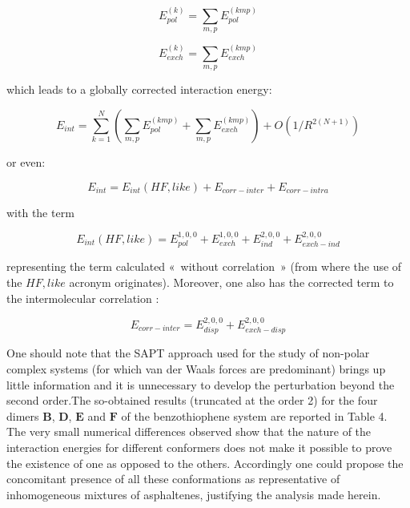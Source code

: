		\begin{equation}
		E_{pol}^{(k)} = \sum_{m,p} E_{pol}^{(kmp)}
		\end{equation}
		
		\begin{equation}
		E_{exch}^{(k)} = \sum_{m,p} E_{exch}^{(kmp)}
		\end{equation}
		
		which leads to a globally corrected interaction energy: 
		
		\begin{equation}
		E_{int} = \sum_{k=1}^{N} ( \sum_{m,p} E_{pol}^{(kmp)} + \sum_{m,p} E_{exch}^{(kmp)} ) + O(1/R^{2 (N+1)})
		\end{equation}
		
		or even:
		
		\begin{equation}
		E_{int} = E_{int} ({\scriptstyle HF,like}) + E_{corr-inter} + E_{corr-intra}
		\end{equation}
		
		with the term 
		
		\begin{equation}
		E_{int} ({\scriptstyle HF, like}) = E^{1,0,0}_{pol} + E^{1,0,0}_{exch} + E^{2,0,0}_{ind} + E^{2,0,0}_{exch-ind}
		\end{equation}
		
		representing the term calculated « without correlation » (from where the use of the ${\scriptstyle HF, like}$ acronym originates). 
		Moreover, one also has the corrected term to the intermolecular correlation :
		
		\begin{equation}
		E_{corr-inter} = E^{2,0,0}_{disp} + E^{2,0,0}_{exch-disp}
		\end{equation}
		
		One should note that the SAPT approach used for the study of non-polar complex systems (for which van der Waals forces are predominant) brings up little information and it is unnecessary to develop the perturbation beyond the second order.The so-obtained results (truncated at the order 2) for the four dimers $\textbf{B}$, $\textbf{D}$, $\textbf{E}$ and $\textbf{F}$ of the benzothiophene system are reported in Table 4. The very small numerical differences observed show that the nature of the interaction energies for different conformers does not make it possible to prove the existence of one as opposed to the others. Accordingly one could propose the concomitant presence of all these conformations as representative of inhomogeneous mixtures of asphaltenes, justifying the analysis made herein.
		
